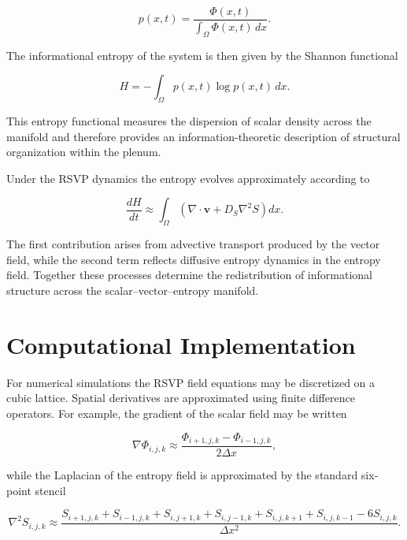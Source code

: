 \documentclass[12pt]{article}
\begin{document}
\begin{equation}
p(x,t) =
\frac{\Phi(x,t)}{\int_{\Omega} \Phi(x,t)\,dx}.
\end{equation}

The informational entropy of the system is then given by the Shannon functional

\begin{equation}
H = -\int_{\Omega} p(x,t)\log p(x,t)\,dx .
\end{equation}

This entropy functional measures the dispersion of scalar density across the manifold and therefore provides an information-theoretic description of structural organization within the plenum.

Under the RSVP dynamics the entropy evolves approximately according to

\begin{equation}
\frac{dH}{dt} \approx
\int_{\Omega}
\left(
\nabla \cdot \mathbf{v}
+
D_S \nabla^2 S
\right) dx .
\end{equation}

The first contribution arises from advective transport produced by the vector field, while the second term reflects diffusive entropy dynamics in the entropy field. Together these processes determine the redistribution of informational structure across the scalar–vector–entropy manifold.

\section{Computational Implementation}
\label{sec:computation}

For numerical simulations the RSVP field equations may be discretized on a cubic lattice. Spatial derivatives are approximated using finite difference operators. For example, the gradient of the scalar field may be written

\begin{equation}
\nabla \Phi_{i,j,k}
\approx
\frac{\Phi_{i+1,j,k}-\Phi_{i-1,j,k}}{2\Delta x},
\end{equation}

while the Laplacian of the entropy field is approximated by the standard six-point stencil

\begin{equation}
\nabla^2 S_{i,j,k}
\approx
\frac{
S_{i+1,j,k}+S_{i-1,j,k}
+S_{i,j+1,k}+S_{i,j-1,k}
+S_{i,j,k+1}+S_{i,j,k-1}
-6S_{i,j,k}
}{\Delta x^2}.
\end{equation}
\end{document}
